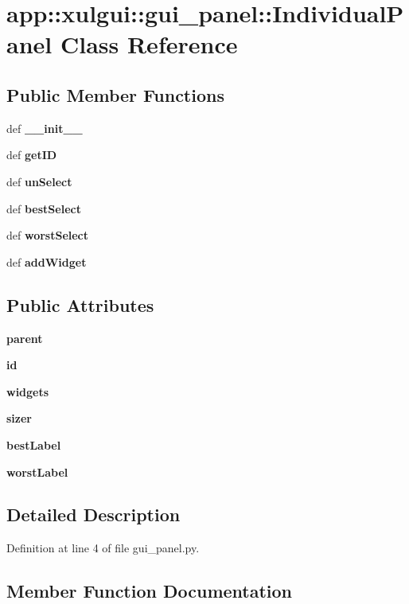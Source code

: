 \section{app::xulgui::gui\_\-panel::IndividualPanel Class Reference}
\label{classapp_1_1xulgui_1_1gui__panel_1_1IndividualPanel}
\subsection*{Public Member Functions}
\begin{CompactItemize}
\item 
def {\bf \_\-\_\-init\_\-\_\-}
\item 
def {\bf getID}
\item 
def {\bf unSelect}
\item 
def {\bf bestSelect}
\item 
def {\bf worstSelect}
\item 
def {\bf addWidget}
\end{CompactItemize}
\subsection*{Public Attributes}
\begin{CompactItemize}
\item 
{\bf parent}
\item 
{\bf id}
\item 
{\bf widgets}
\item 
{\bf sizer}
\item 
{\bf bestLabel}
\item 
{\bf worstLabel}
\end{CompactItemize}


\subsection{Detailed Description}


Definition at line 4 of file gui\_\-panel.py.

\subsection{Member Function Documentation}
